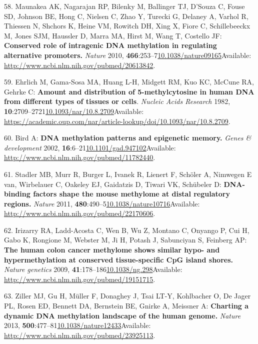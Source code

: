\documentclass[
]{book}
\begin{document}
\leavevmode\hypertarget{ref-Maunakea2010}{}%
58. Maunakea AK, Nagarajan RP, Bilenky M, Ballinger TJ, D'Souza C, Fouse SD, Johnson BE, Hong C, Nielsen C, Zhao Y, Turecki G, Delaney A, Varhol R, Thiessen N, Shchors K, Heine VM, Rowitch DH, Xing X, Fiore C, Schillebeeckx M, Jones SJM, Haussler D, Marra MA, Hirst M, Wang T, Costello JF: \textbf{Conserved role of intragenic DNA methylation in regulating alternative promoters.} \emph{Nature} 2010, \textbf{466}:253--7\href{https://doi.org/10.1038/nature09165}{10.1038/nature09165}Available: \url{http://www.ncbi.nlm.nih.gov/pubmed/20613842}.

\leavevmode\hypertarget{ref-Ehrlich1982}{}%
59. Ehrlich M, Gama-Sosa MA, Huang L-H, Midgett RM, Kuo KC, McCune RA, Gehrke C: \textbf{Amount and distribution of 5-methylcytosine in human DNA from different types of tissues or cells}. \emph{Nucleic Acids Research} 1982, \textbf{10}:2709--2721\href{https://doi.org/10.1093/nar/10.8.2709}{10.1093/nar/10.8.2709}Available: \url{https://academic.oup.com/nar/article-lookup/doi/10.1093/nar/10.8.2709}.

\leavevmode\hypertarget{ref-Bird2002}{}%
60. Bird A: \textbf{DNA methylation patterns and epigenetic memory.} \emph{Genes \& development} 2002, \textbf{16}:6--21\href{https://doi.org/10.1101/gad.947102}{10.1101/gad.947102}Available: \url{http://www.ncbi.nlm.nih.gov/pubmed/11782440}.

\leavevmode\hypertarget{ref-Stadler2011}{}%
61. Stadler MB, Murr R, Burger L, Ivanek R, Lienert F, Schöler A, Nimwegen E van, Wirbelauer C, Oakeley EJ, Gaidatzis D, Tiwari VK, Schübeler D: \textbf{DNA-binding factors shape the mouse methylome at distal regulatory regions.} \emph{Nature} 2011, \textbf{480}:490--5\href{https://doi.org/10.1038/nature10716}{10.1038/nature10716}Available: \url{http://www.ncbi.nlm.nih.gov/pubmed/22170606}.

\leavevmode\hypertarget{ref-Irizarry2009}{}%
62. Irizarry RA, Ladd-Acosta C, Wen B, Wu Z, Montano C, Onyango P, Cui H, Gabo K, Rongione M, Webster M, Ji H, Potash J, Sabunciyan S, Feinberg AP: \textbf{The human colon cancer methylome shows similar hypo- and hypermethylation at conserved tissue-specific CpG island shores.} \emph{Nature genetics} 2009, \textbf{41}:178--186\href{https://doi.org/10.1038/ng.298}{10.1038/ng.298}Available: \url{http://www.ncbi.nlm.nih.gov/pubmed/19151715}.

\leavevmode\hypertarget{ref-Ziller2013}{}%
63. Ziller MJ, Gu H, Müller F, Donaghey J, Tsai LT-Y, Kohlbacher O, De Jager PL, Rosen ED, Bennett DA, Bernstein BE, Gnirke A, Meissner A: \textbf{Charting a dynamic DNA methylation landscape of the human genome.} \emph{Nature} 2013, \textbf{500}:477--81\href{https://doi.org/10.1038/nature12433}{10.1038/nature12433}Available: \url{http://www.ncbi.nlm.nih.gov/pubmed/23925113}.
\end{document}
